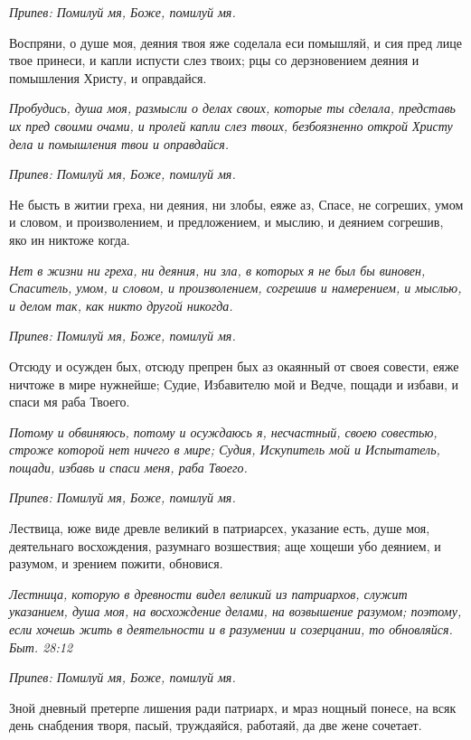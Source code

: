 \itshape Припев:\normalfont{} Помилуй мя, Боже, помилуй мя.


Воспряни, о душе моя, деяния твоя яже соделала еси помышляй, и сия пред лице твое принеси, и капли испусти слез твоих; рцы со дерзновением деяния и помышления Христу, и оправдайся.


\itshape Пробудись, душа моя, размысли о делах своих, которые ты сделала, представь их пред своими очами, и пролей капли слез твоих, безбоязненно открой Христу дела и помышления твои и оправдайся.\normalfont{}


\itshape Припев:\normalfont{} Помилуй мя, Боже, помилуй мя.


Не бысть в житии греха, ни деяния, ни злобы, еяже аз, Спасе, не согреших, умом и словом, и произволением, и предложением, и мыслию, и деянием согрешив, яко ин никтоже когда.


\itshape Нет в жизни ни греха, ни деяния, ни зла, в которых я не был бы виновен, Спаситель, умом, и словом, и произволением, согрешив и намерением, и мыслью, и делом так, как никто другой никогда.\normalfont{}


\itshape Припев:\normalfont{} Помилуй мя, Боже, помилуй мя.


Отсюду и осужден бых, отсюду препрен бых аз окаянный от своея совести, еяже ничтоже в мире нужнейше; Судие, Избавителю мой и Ведче, пощади и избави, и спаси мя раба Твоего.


\itshape Потому и обвиняюсь, потому и осуждаюсь я, несчастный, своею совестью, строже которой нет ничего в мире; Судия, Искупитель мой и Испытатель, пощади, избавь и спаси меня, раба Твоего.\normalfont{}


\itshape Припев:\normalfont{} Помилуй мя, Боже, помилуй мя.


Лествица, юже виде древле великий в патриарсех, указание есть, душе моя, деятельнаго восхождения, разумнаго возшествия; аще хощеши убо деянием, и разумом, и зрением пожити, обновися.


\itshape Лестница, которую в древности видел великий из патриархов, служит указанием, душа моя, на восхождение делами, на возвышение разумом; поэтому, если хочешь жить в деятельности и в разумении и созерцании, то обновляйся. Быт. 28:12\normalfont{}


\itshape Припев:\normalfont{} Помилуй мя, Боже, помилуй мя.


Зной дневный претерпе лишения ради патриарх, и мраз нощный понесе, на всяк день снабдения творя, пасый, труждаяйся, работаяй, да две жене сочетает.


